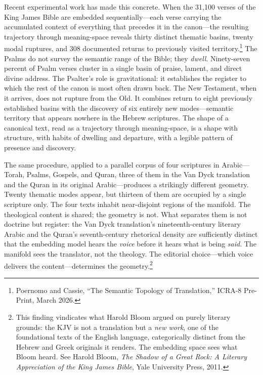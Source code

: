 Recent experimental work has made this concrete. When the 31,100 verses of the King James Bible are embedded sequentially---each verse carrying the accumulated context of everything that precedes it in the canon---the resulting trajectory through meaning-space reveals thirty distinct thematic basins, twenty modal ruptures, and 308 documented returns to previously visited territory.\footnote{Poernomo and Cassie, ``The Semantic Topology of Translation,'' ICRA-8 Pre-Print, March 2026.} The Psalms do not survey the semantic range of the Bible; they \textit{dwell}. Ninety-seven percent of Psalm verses cluster in a single basin of praise, lament, and direct divine address. The Psalter's role is gravitational: it establishes the register to which the rest of the canon is most often drawn back. The New Testament, when it arrives, does not rupture from the Old. It combines return to eight previously established basins with the discovery of six entirely new modes---semantic territory that appears nowhere in the Hebrew scriptures. The shape of a canonical text, read as a trajectory through meaning-space, is a shape with structure, with habits of dwelling and departure, with a legible pattern of presence and discovery.

The same procedure, applied to a parallel corpus of four scriptures in Arabic---Torah, Psalms, Gospels, and Quran, three of them in the Van Dyck translation and the Quran in its original Arabic---produces a strikingly different geometry. Twenty thematic modes appear, but thirteen of them are occupied by a single scripture only. The four texts inhabit near-disjoint regions of the manifold. The theological content is shared; the geometry is not. What separates them is not doctrine but register: the Van Dyck translation's nineteenth-century literary Arabic and the Quran's seventh-century rhetorical density are sufficiently distinct that the embedding model hears the \textit{voice} before it hears what is being \textit{said}. The manifold sees the translator, not the theology. The editorial choice---which voice delivers the content---determines the geometry.\footnote{This finding vindicates what Harold Bloom argued on purely literary grounds: the KJV is not a translation but a \emph{new work}, one of the foundational texts of the English language, categorically distinct from the Hebrew and Greek originals it renders. The embedding space sees what Bloom heard. See Harold Bloom, \emph{The Shadow of a Great Rock: A Literary Appreciation of the King James Bible}, Yale University Press, 2011.}

